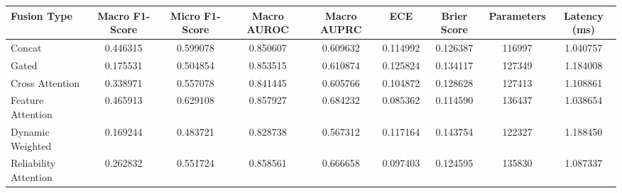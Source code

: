 \begin{tabular}{lcccccccc}
\toprule
Fusion Type & Macro F1-Score & Micro F1-Score & Macro AUROC & Macro AUPRC & ECE & Brier Score & Parameters & Latency (ms) \\
\midrule
Concat & 0.446315 & 0.599078 & 0.850607 & 0.609632 & 0.114992 & 0.126387 & 116997 & 1.040757 \\
Gated & 0.175531 & 0.504854 & 0.853515 & 0.610874 & 0.125824 & 0.134117 & 127349 & 1.184008 \\
Cross Attention & 0.338971 & 0.557078 & 0.841445 & 0.605766 & 0.104872 & 0.128628 & 127413 & 1.108861 \\
Feature Attention & 0.465913 & 0.629108 & 0.857927 & 0.684232 & 0.085362 & 0.114590 & 136437 & 1.038654 \\
Dynamic Weighted & 0.169244 & 0.483721 & 0.828738 & 0.567312 & 0.117164 & 0.143754 & 122327 & 1.188450 \\
Reliability Attention & 0.262832 & 0.551724 & 0.858561 & 0.666658 & 0.097403 & 0.124595 & 135830 & 1.087337 \\
\bottomrule
\end{tabular}
